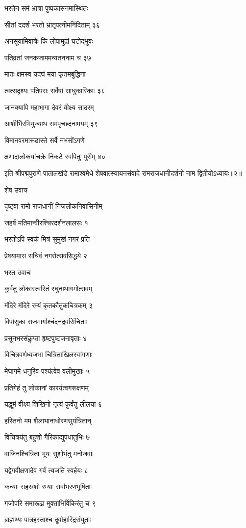 भरतेन समं भ्रात्रा पुष्पकासनमास्थितः

सीतां ददर्श भरतो भ्रातृपत्नीमनिंदिताम् ३६

अनसूयामिवात्रेः किं लोपामुद्रां घटोद्भुवः

पतिव्रतां जनकजाममन्यतननाम च ३७

मातः क्षमस्व यदघं मया कृतमबुद्धिना

त्वत्सदृश्यः पतिपराः सर्वेषां साधुकारिकाः ३८

जानक्यापि महाभागा देवरं वीक्ष्य सादरम्

आशीर्भिरभियुज्याथ समपृच्छदनामयम् ३९

विमानवरमारूढास्ते सर्वे नभसोंऽगणे

क्षणादालोकयांचक्रे निकटे स्वपितुः पुरीम् ४०

इति श्रीपद्मपुराणे पातालखंडे रामाश्वमेधे शेषवात्स्यायनसंवादे रामराजधानीदर्शनो नाम द्वितीयोऽध्यायः॥२॥


शेष उवाच

दृष्ट्वा रामो राजधानीं निजलोकनिवासिनीम्

जहर्ष मतिमान्वीरश्चिरदर्शनलालसः १

भरतोऽपि स्वकं मित्रं सुमुखं नगरं प्रति

प्रेषयामास सचिवं नगरोत्सवसिद्धये २

भरत उवाच

कुर्वंतु लोकास्त्वरितं रघुनाथागमोत्सवम्

मंदिरे मंदिरे रम्यं कृतकौतुकचित्रकम् ३

विपांसुका राजमार्गाश्चंदनद्रवसिंचिताः

प्रसूनभरसंकॢप्ता हृष्टपुष्टजनावृताः ४

विचित्रवर्णध्वजभा चित्रिताखिलस्वांगणाः

मेघागमे धनुरिव पश्यंत्वेव वलीमुखाः ५

प्रतिगेहं तु लोकानां कारयंत्वगरूक्षणम्

यद्धूमं वीक्ष्य शिखिनो नृत्यं कुर्वंतु लीलया ६

हस्तिनो मम शैलाभानाधोरणसुयंत्रितान्

विचित्रयंतु बहुशो गैरिकाद्युपधातुभिः ७

वाजिनश्चित्रिता भूयः सुशोभंतु मनोजवाः

यद्वेगवीक्षणादेव गर्वं त्यजति स्वर्हयः ८

कन्याः सहस्रशो रम्याः सर्वाभरणभूषिताः

गजोपरि समारूढा मुक्ताभिर्विकिरंतु च ९

ब्राह्मण्यः पात्रहस्ताश्च दूर्वाहारिद्रसंयुताः

